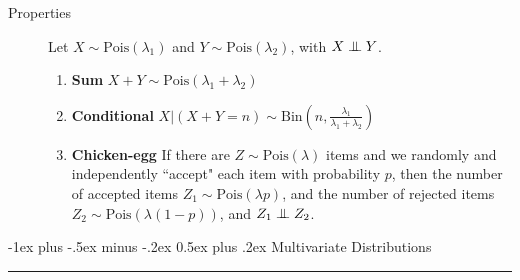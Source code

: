 \documentclass[10pt,landscape]{article}
\makeatletter
\newcommand\independent{\protect\mathpalette{\protect\independenT}{\perp}}
\def\independenT#1#2{\mathrel{\setbox0\hbox{$#1#2$}%
    \copy0\kern-\wd0\mkern4mu\box0}}
\newcommand{\Bin}{\textrm{Bin}}
\newcommand{\Pois}{\textrm{Pois}}
\renewcommand{\section}{\@startsection{section}{1}{0mm}%
                                {-1ex plus -.5ex minus -.2ex}%
                                {0.5ex plus .2ex}%
                                {\normalfont\large\bfseries}}
\makeatother
\begin{document}
\begin{multicols*}{3}
\begin{description}
        \item[Properties]
        Let $X \sim \Pois(\lambda_1)$ and $Y \sim \Pois(\lambda_2)$, with $X \independent Y$.
                                                
        \begin{enumerate}
            \item \textbf{Sum} $X + Y \sim \Pois(\lambda_1 + \lambda_2)$
            \item \textbf{Conditional} $X | (X + Y = n) \sim \Bin\left(n, \frac{\lambda_1}{\lambda_1 + \lambda_2}\right)$
            \item \textbf{Chicken-egg} If there are $Z \sim \Pois(\lambda)$ items and we randomly and independently ``accept" each item with probability $p$, then the number of accepted items $Z_1 \sim \Pois(\lambda p)$, and the number of rejected items $Z_2 \sim \Pois(\lambda (1-p))$, and $Z_1 \independent Z_2$.
        \end{enumerate}
                                                    
    \end{description}
                                    
                                    
    \section{Multivariate Distributions} \smallskip \hrule height 2pt \smallskip
                                    
                                    

\end{multicols*}
\end{document}
